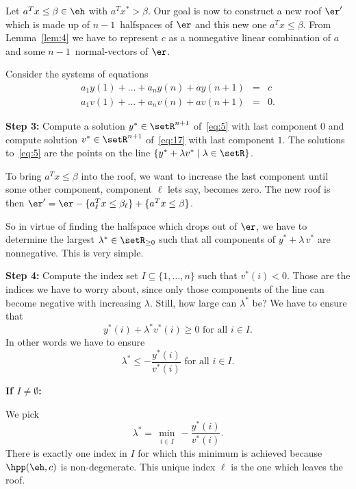 Let $a^Tx\leq\beta \in \eh$ with $a^T x^* > \beta$.  Our
goal is now to construct a new roof $\er'$ which is made up of
$n-1$~halfspaces of $\er$ and this new one $a^Tx\leq\beta$.  From
Lemma~\ref{lem:4} we have to represent $c$ as a nonnegative linear
combination of $a$ and some $n-1$~normal-vectors of $\er$.  

Consider the systems of equations 
\begin{eqnarray}
  a_1 y(1) + \ldots + a_n y(n) + a y(n+1) & = &  c \label{eq:5}\\
  a_1 v(1) + \ldots + a_n v(n) + a v(n+1) & = &  0. \label{eq:17}
\end{eqnarray}

\noindent
{\bf Step 3:} Compute  a  solution $y^* \in \setR^{n+1}$ of~\eqref{eq:5} with
last component $0$ and compute  solution $v^* \in \setR^{n+1}$
of~\eqref{eq:17} with last component $1$. The solutions
to~\eqref{eq:5} are the points on the line 
$\{ y^* + \lambda v^* \mid \lambda \in\setR\}$. 

To bring $a^Tx\leq\beta$ into the roof, we want to increase the last component 
until some other component, component $\ell$ lets say,  becomes zero.
The new roof is then $\er'=\er - \{a_\ell^Tx\leq\beta_\ell\} + \{a^Tx\leq\beta\}$. 

So in virtue of finding the halfspace which drops out of $\er$, we
have to determine the largest $\lambda^* \in \setR_{\geq0}$ such that all components of
$y^* + \lambda\,v^*$ are nonnegative. This is very simple. 

\noindent 
{\bf Step 4:} Compute   the index set $I \subseteq\{1,\ldots,n\}$ such that
$v^*(i)<0$. Those are the 
indices we have to worry about, since only those components of the
line can become negative with increasing $\lambda$. Still, how large can
$\lambda^*$ be? We have to ensure that
\begin{equation}
  \label{eq:8}
  y^*(i) +\lambda^* v^*(i) \geq0 \text{ for all } i \in I.
\end{equation}
In other words we have to ensure 
\begin{equation}
  \label{eq:4}
  \lambda^* \leq - \frac{y^*(i)}{v^*(i)} \text{ for all }  i\in I.
\end{equation}


\noindent 
{\bf If $I \neq \emptyset$: }

We pick 
 \begin{equation}
   \label{eq:9}
   \lambda^* = \min_{\substack{i\in I}}  - \frac{y^*(i)}{v^*(i)}. 
\end{equation}
There is exactly one index in $I$ for which this minimum is achieved
because $\hpp(\eh,c)$ is non-degenerate.  This unique index $\ell$ is the
one which leaves the roof.

